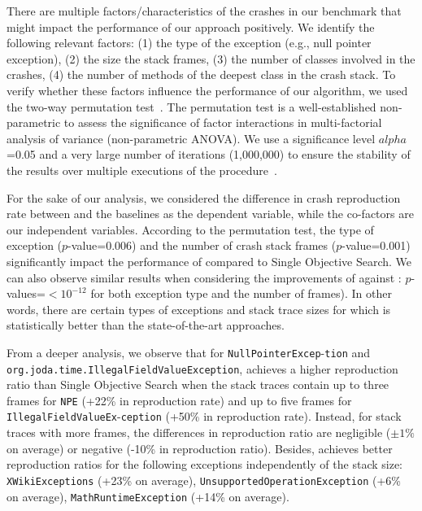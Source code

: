 There are multiple factors/characteristics of the crashes in our benchmark that might impact the performance of our approach positively. We identify the following relevant factors: (1) the type of the exception (e.g., null pointer exception), (2) the size the stack frames, (3) the number of classes involved in the crashes, (4) the number of methods of the deepest class in the crash stack. To verify whether these factors influence the performance of our algorithm, we used the two-way permutation test~\cite{pesarin2010permutation}. The permutation test is a well-established non-parametric to assess the significance of factor interactions in multi-factorial analysis of variance (non-parametric ANOVA). We use a significance level $alpha$=0.05 and a very large number of iterations (1,000,000) to ensure the stability of the results over multiple executions of the procedure~\cite{pesarin2010permutation}. 

For the sake of our analysis, we considered the difference in crash reproduction rate between \moho and the baselines as the dependent variable, while the co-factors are our independent variables. According to the permutation test, the type of exception ($p$-value=0.006) and the number of crash stack frames ($p$-value=0.001) significantly impact the performance of \moho compared to Single Objective Search. We can also observe similar results when considering the improvements of \moho against \decomposition: $p$-values=$<10^{-12}$ for both exception type and the number of frames). In other words, there are certain types of exceptions and stack trace sizes for which \moho is statistically better than the state-of-the-art approaches.

From a deeper analysis, we observe that for \texttt{NullPointerExcep}-\texttt{tion} and \texttt{org.joda.time.IllegalFieldValueException}, \moho achieves a higher reproduction ratio than Single Objective Search when the stack traces contain up to three frames for \texttt{NPE} (+22\% in reproduction rate) and up to five frames for \texttt{IllegalFieldValueEx}-\texttt{ception} (+50\% in reproduction rate). Instead, for stack traces with more frames, the differences in reproduction ratio are negligible ($\pm 1\%$ on average) or negative (-10\% in reproduction ratio). Besides, \moho achieves better reproduction ratios for the following exceptions independently of the stack size: \texttt{XWikiExceptions} (+23\% on average), \texttt{UnsupportedOperationException} (+6\% on average), \texttt{MathRuntimeException} (+14\% on average).

